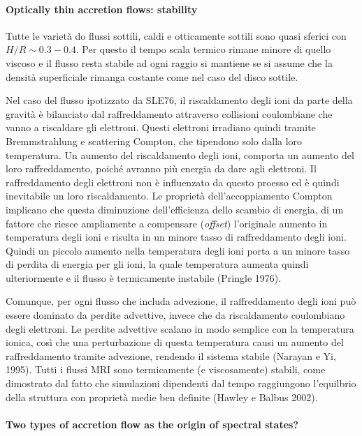 \documentclass[a4paperbi]{article}
\begin{document}
\paragraph{Optically thin accretion flows: stability}

	Tutte le varietà do flussi sottili, caldi e otticamente sottili sono quasi sferici con $H/R\sim0.3-0.4$. Per questo il tempo scala termico rimane minore di quello viscoso e il flusso resta stabile ad ogni raggio si mantiene se si assume che la densità superficiale rimanga costante come nel caso del disco sottile.
	
	Nel caso del flusso ipotizzato da SLE76, il riscaldamento degli ioni da parte della gravità è bilanciato dal raffreddamento attraverso collisioni coulombiane che vanno a riscaldare gli elettroni. Questi elettroni irradiano quindi tramite Bremmstrahlung e scattering Compton, che tipendono solo dalla loro temperatura. Un aumento del riscaldamento degli ioni, comporta un aumento del loro raffreddamento, poiché avranno più energia da dare agli elettroni. Il raffreddamento degli elettroni non è influenzato da questo proesso ed è quindi inevitabile un loro riscaldamento. Le proprietà dell'accoppiamento Compton implicano che questa diminuzione dell'efficienza dello scambio di energia, di un fattore che riesce ampliamente a compensare (\textit{offset}) l'originale aumento in temperatura degli ioni e risulta in un minore tasso di raffreddamento degli ioni. Quindi un piccolo aumento nella temperatura degli ioni porta a un minore tasso di perdita di energia per gli ioni, la quale temperatura aumenta quindi ulteriormente e il flusso è termicamente instabile (Pringle 1976).
	
	Comunque, per ogni flusso che includa advezione, il raffreddamento degli ioni può essere dominato da perdite advettive, invece che da riscaldamento coulombiano degli elettroni. Le perdite advettive scalano in modo semplice con la temperatura ionica, così che una perturbazione di questa temperatura causi un aumento del raffreddamento tramite advezione, rendendo il sistema stabile (Narayan e Yi, 1995). Tutti i flussi MRI sono termicamente  (e viscosamente) stabili, come dimostrato dal fatto che simulazioni dipendenti dal tempo raggiungono l'equilbrio della struttura con proprietà medie ben definite (Hawley e Balbus 2002).
	
\paragraph{Two types of accretion flow as the origin of spectral states?}
\end{document}
